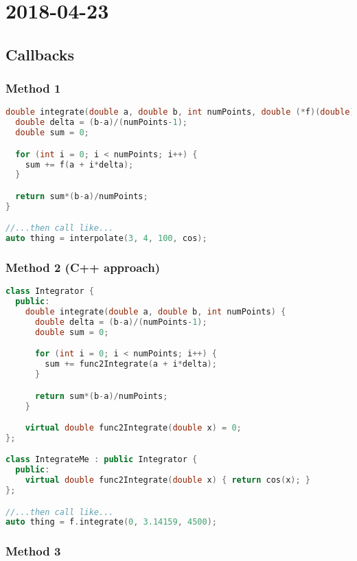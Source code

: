 \section{2018-04-23}

\subsection{Callbacks}

\subsubsection{Method 1}

\begin{lstlisting}[language=C++]
double integrate(double a, double b, int numPoints, double (*f)(double)) {
  double delta = (b-a)/(numPoints-1);
  double sum = 0;

  for (int i = 0; i < numPoints; i++) {
    sum += f(a + i*delta);
  }

  return sum*(b-a)/numPoints;
}

//...then call like...
auto thing = interpolate(3, 4, 100, cos);
\end{lstlisting}


\subsubsection{Method 2 (C++ approach)}

\begin{lstlisting}[language=C++]
class Integrator {
  public:
    double integrate(double a, double b, int numPoints) {
      double delta = (b-a)/(numPoints-1);
      double sum = 0;

      for (int i = 0; i < numPoints; i++) {
        sum += func2Integrate(a + i*delta);
      }

      return sum*(b-a)/numPoints;
    }

    virtual double func2Integrate(double x) = 0;
};

class IntegrateMe : public Integrator {
  public:
    virtual double func2Integrate(double x) { return cos(x); }
};

//...then call like...
auto thing = f.integrate(0, 3.14159, 4500);
\end{lstlisting}


\subsubsection{Method 3}

